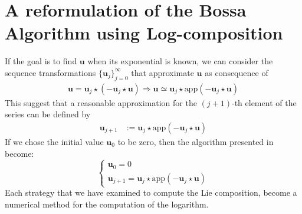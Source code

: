 \section{A reformulation of the Bossa Algorithm using Log-composition}

If the goal is to find $\mathbf{u}$ when its exponential is known, we can consider the sequence transformations $\{\mathbf{u}_{j}  \}_{j=0}^{\infty}$ that approximate $\mathbf{u}$ as consequence of
\begin{align*}
\mathbf{u} = \mathbf{u}_{j} \star  (-\mathbf{u}_{j}  \star  \mathbf{u} ) \Longrightarrow
\mathbf{u} \simeq \mathbf{u}_{j} \star  \text{app}(-\mathbf{u}_{j}  \star  \mathbf{u} )
\end{align*}
This suggest that a reasonable approximation for the $(j+1)$-th element of the series can be defined by
\begin{align*}
\mathbf{u}_{j+1} & :=  \mathbf{u}_{j} \star  \text{app}(-\mathbf{u}_{j}  \star  \mathbf{u} )
\end{align*}
If we chose the initial value $\mathbf{u}_{0}$ to be zero, then the algorithm presented in \cite{Bossa:08}  become:
\begin{equation}\label{eq:bossa_reformulated}
\begin{cases}
\mathbf{u}_0 = 0 \\
\mathbf{u}_{j+1} = \mathbf{u}_{j} \star  \text{app}(-\mathbf{u}_{j}  \star  \mathbf{u} )
\end{cases}
\end{equation}
Each strategy that we have examined to compute the Lie composition, become a numerical method for the computation of the logarithm.
